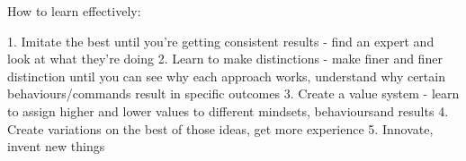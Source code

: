 How to learn effectively:

1. Imitate the best until you're getting consistent results - find an expert and look at what they're doing
2. Learn to make distinctions - make finer and finer distinction until you can see why each approach works, understand why certain behaviours/commands result in specific outcomes
3. Create a value system - learn to assign higher and lower values to different mindsets, behavioursand results
4. Create variations on the best of those ideas, get more experience
5. Innovate, invent new things
